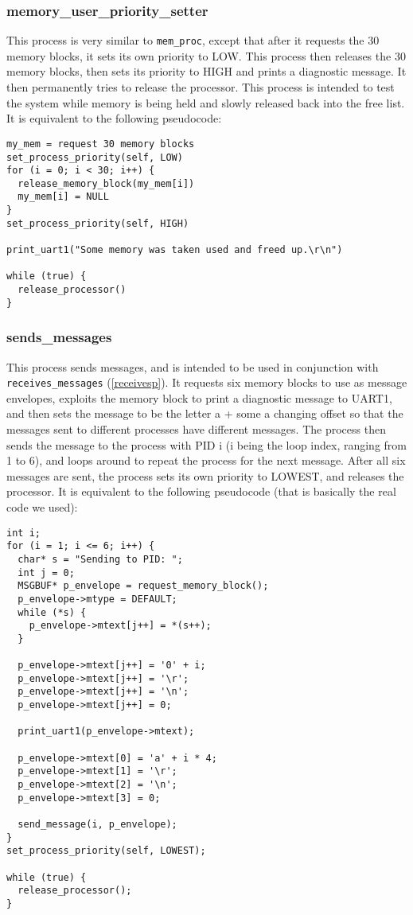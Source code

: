 \documentclass[12pt]{article}
\begin{document}
\subsubsection{memory\_user\_priority\_setter}\label{mupsp}
This process is very similar to \verb|mem_proc|, except that after it requests the 30 memory blocks, it sets its own priority to LOW. This process then releases the 30 memory blocks, then sets its priority to HIGH and prints a diagnostic message. It then permanently tries to release the processor. This process is intended to test the system while memory is being held and slowly released back into the free list. It is equivalent to the following pseudocode:
\begin{lstlisting}
my_mem = request 30 memory blocks
set_process_priority(self, LOW)
for (i = 0; i < 30; i++) {
  release_memory_block(my_mem[i])
  my_mem[i] = NULL
}
set_process_priority(self, HIGH)

print_uart1("Some memory was taken used and freed up.\r\n")

while (true) {
  release_processor()
}
\end{lstlisting}

\subsubsection{sends\_messages}\label{sendsp}
This process sends messages, and is intended to be used in conjunction with \verb|receives_messages| (\ref{receivesp}). It requests six memory blocks to use as message envelopes, exploits the memory block to print a diagnostic message to UART1, and then sets the message to be the letter a + some a changing offset so that the messages sent to different processes have different messages. The process then sends the message to the process with PID i (i being the loop index, ranging from 1 to 6), and loops around to repeat the process for the next message. After all six messages are sent, the process sets its own priority to LOWEST, and releases the processor. It is equivalent to the following pseudocode (that is basically the real code we used):
\begin{lstlisting}
int i;
for (i = 1; i <= 6; i++) {
  char* s = "Sending to PID: ";
  int j = 0;
  MSGBUF* p_envelope = request_memory_block();
  p_envelope->mtype = DEFAULT;
  while (*s) {
    p_envelope->mtext[j++] = *(s++);
  }

  p_envelope->mtext[j++] = '0' + i;
  p_envelope->mtext[j++] = '\r';
  p_envelope->mtext[j++] = '\n';
  p_envelope->mtext[j++] = 0;

  print_uart1(p_envelope->mtext);

  p_envelope->mtext[0] = 'a' + i * 4;
  p_envelope->mtext[1] = '\r';
  p_envelope->mtext[2] = '\n';
  p_envelope->mtext[3] = 0;

  send_message(i, p_envelope);
}
set_process_priority(self, LOWEST);

while (true) {
  release_processor();
}
\end{lstlisting}
\end{document}
